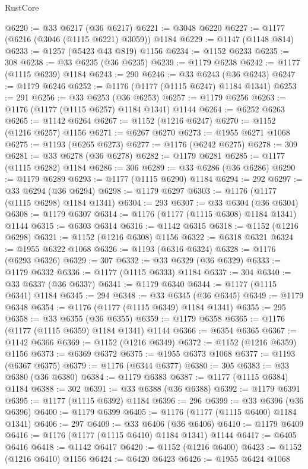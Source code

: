 \begin{lexlean}{RustCore}
\begin{coremodule}
@6220 := @33 @6217 (@36 @6217)
@6221 := @3048 @6220
@6227 := @1177 (@6216 (@3046 (@1115 @6221) @3059)) @1184
@6229 := @1147 (@1148 @814)
@6233 := @1257 (@5423 @43 @819) @1156
@6234 := @1152 @6233
@6235 := 308
@6238 := @33 @6235 (@36 @6235)
@6239 := @1179 @6238
@6242 := @1177 (@1115 @6239) @1184
@6243 := 290
@6246 := @33 @6243 (@36 @6243)
@6247 := @1179 @6246
@6252 := @1176 (@1177 (@1115 @6247) @1184 @1341)
@6253 := 291
@6256 := @33 @6253 (@36 @6253)
@6257 := @1179 @6256
@6263 := @1176 (@1177 (@1115 @6257) @1184 @1341) @1144
@6264 := @6252 @6263
@6265 := @1142 @6264
@6267 := @1152 (@1216 @6247)
@6270 := @1152 (@1216 @6257) @1156
@6271 := @6267 @6270
@6273 := @1955 @6271 @1068
@6275 := @1193 (@6265 @6273)
@6277 := @1176 (@6242 @6275)
@6278 := 309
@6281 := @33 @6278 (@36 @6278)
@6282 := @1179 @6281
@6285 := @1177 (@1115 @6282) @1184
@6286 := 306
@6289 := @33 @6286 (@36 @6286)
@6290 := @1179 @6289
@6293 := @1177 (@1115 @6290) @1184
@6294 := 292
@6297 := @33 @6294 (@36 @6294)
@6298 := @1179 @6297
@6303 := @1176 (@1177 (@1115 @6298) @1184 @1341)
@6304 := 293
@6307 := @33 @6304 (@36 @6304)
@6308 := @1179 @6307
@6314 := @1176 (@1177 (@1115 @6308) @1184 @1341) @1144
@6315 := @6303 @6314
@6316 := @1142 @6315
@6318 := @1152 (@1216 @6298)
@6321 := @1152 (@1216 @6308) @1156
@6322 := @6318 @6321
@6324 := @1955 @6322 @1068
@6326 := @1193 (@6316 @6324)
@6328 := @1176 (@6293 @6326)
@6329 := 307
@6332 := @33 @6329 (@36 @6329)
@6333 := @1179 @6332
@6336 := @1177 (@1115 @6333) @1184
@6337 := 304
@6340 := @33 @6337 (@36 @6337)
@6341 := @1179 @6340
@6344 := @1177 (@1115 @6341) @1184
@6345 := 294
@6348 := @33 @6345 (@36 @6345)
@6349 := @1179 @6348
@6354 := @1176 (@1177 (@1115 @6349) @1184 @1341)
@6355 := 295
@6358 := @33 @6355 (@36 @6355)
@6359 := @1179 @6358
@6365 := @1176 (@1177 (@1115 @6359) @1184 @1341) @1144
@6366 := @6354 @6365
@6367 := @1142 @6366
@6369 := @1152 (@1216 @6349)
@6372 := @1152 (@1216 @6359) @1156
@6373 := @6369 @6372
@6375 := @1955 @6373 @1068
@6377 := @1193 (@6367 @6375)
@6379 := @1176 (@6344 @6377)
@6380 := 305
@6383 := @33 @6380 (@36 @6380)
@6384 := @1179 @6383
@6387 := @1177 (@1115 @6384) @1184
@6388 := 302
@6391 := @33 @6388 (@36 @6388)
@6392 := @1179 @6391
@6395 := @1177 (@1115 @6392) @1184
@6396 := 296
@6399 := @33 @6396 (@36 @6396)
@6400 := @1179 @6399
@6405 := @1176 (@1177 (@1115 @6400) @1184 @1341)
@6406 := 297
@6409 := @33 @6406 (@36 @6406)
@6410 := @1179 @6409
@6416 := @1176 (@1177 (@1115 @6410) @1184 @1341) @1144
@6417 := @6405 @6416
@6418 := @1142 @6417
@6420 := @1152 (@1216 @6400)
@6423 := @1152 (@1216 @6410) @1156
@6424 := @6420 @6423
@6426 := @1955 @6424 @1068

\end{coremodule}
\end{lexlean}
